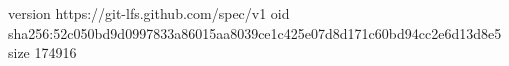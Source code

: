 version https://git-lfs.github.com/spec/v1
oid sha256:52c050bd9d0997833a86015aa8039ce1c425e07d8d171c60bd94cc2e6d13d8e5
size 174916
